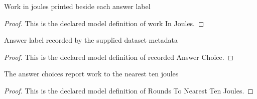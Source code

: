 \begin{definition}
  \label{def:physics:phyx-mini-0492:phyxminiproblems-problemphyxmini0492-answerchoice-workinjoules}
  Work in joules printed beside each answer label
\end{definition}
\begin{proof}
  This is the declared model definition of work In Joules.
\end{proof}
\begin{definition}
  \label{def:physics:phyx-mini-0492:phyxminiproblems-problemphyxmini0492-recordedanswerchoice}
  Answer label recorded by the supplied dataset metadata
\end{definition}
\begin{proof}
  This is the declared model definition of recorded Answer Choice.
\end{proof}
\begin{definition}
  \label{def:physics:phyx-mini-0492:phyxminiproblems-problemphyxmini0492-roundstonearesttenjoules}
  The answer choices report work to the nearest ten joules
\end{definition}
\begin{proof}
  This is the declared model definition of Rounds To Nearest Ten Joules.
\end{proof}
